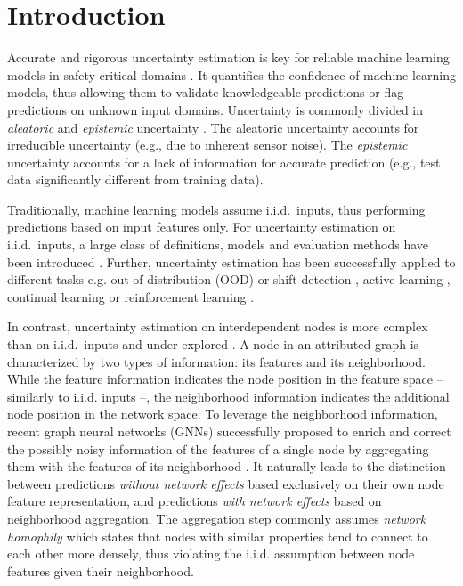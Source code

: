 \section{Introduction}
\label{sec:introduction}

Accurate and rigorous uncertainty estimation is key for reliable machine learning models in safety-critical domains \cite{interpretable-ml}. It quantifies the confidence of machine learning models, thus allowing them to validate knowledgeable predictions or flag predictions on unknown input domains. Uncertainty is commonly divided in \emph{aleatoric} and \emph{epistemic} uncertainty \cite{Gal2016a}. The aleatoric uncertainty accounts for irreducible uncertainty (e.g., due to inherent sensor noise). The \emph{epistemic} uncertainty accounts for a lack of information for accurate prediction (e.g., test data significantly different from training data).

Traditionally, machine learning models assume i.i.d.\ inputs, thus performing predictions based on input features only. For uncertainty estimation on i.i.d.\ inputs, a large class of definitions, models and evaluation methods have been introduced \citep{Gal2016a, Malinin2017, Abdar2020, Ovadia2019, robustness-uncertainty-dirichlet}. Further, uncertainty estimation has been successfully applied to different tasks e.g. out-of-distribution (OOD) or shift detection \citep{Ovadia2019}, active learning \cite{uncertainty-meta-learning, bayesian-meta-learning}, continual learning \citep{uncertainty-continual-learning} or reinforcement learning \citep{uncertainty-rl}. 

In contrast, uncertainty estimation on interdependent nodes is more complex than on i.i.d.\ inputs and under-explored \citep{Abdar2020}. A node in an attributed graph is characterized by two types of information: its features and its neighborhood. While the feature information indicates the node position in the feature space -- similarly to i.i.d. inputs --, the neighborhood information indicates the additional node position in the network space. To leverage the neighborhood information, recent graph neural networks (GNNs) successfully proposed to enrich and correct the possibly noisy information of the features of a single node by aggregating them with the features of its neighborhood \cite{Kipf2016, Velickovic2017, Klicpera2018}. It naturally leads to the distinction between predictions \emph{without network effects} based exclusively on their own node feature representation, and predictions \emph{with network effects} based on neighborhood aggregation. The aggregation step commonly assumes \emph{network homophily} which states that nodes with similar properties tend to connect to each other more densely, thus violating the i.i.d. assumption between node features given their neighborhood. 

